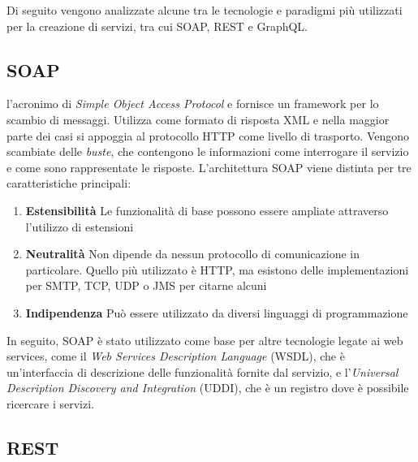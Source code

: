 Di seguito vengono analizzate alcune tra le tecnologie e paradigmi più utilizzati per la creazione di servizi, tra cui SOAP, REST e GraphQL.

\subsection{SOAP\label{sec:soap-introduzione}}

\upe l'acronimo di \emph{Simple Object Access Protocol} e fornisce un framework per lo scambio di messaggi.  Utilizza come formato di risposta XML e nella maggior parte dei casi si appoggia al protocollo HTTP come livello di trasporto. Vengono scambiate delle \emph{buste}, che contengono le informazioni come interrogare il servizio e come sono rappresentate le risposte. L'architettura SOAP viene distinta per tre caratteristiche principali:

\begin{enumerate}
	\item \textbf{Estensibilità} Le funzionalità di base possono essere ampliate attraverso l'utilizzo di estensioni
	\item \textbf{Neutralità} Non dipende da nessun protocollo di comunicazione in particolare. Quello più utilizzato è HTTP, ma esistono delle implementazioni per SMTP, TCP, UDP o JMS per citarne alcuni
	\item \textbf{Indipendenza} Può essere utilizzato da diversi linguaggi di programmazione
\end{enumerate}

In seguito, SOAP è stato utilizzato come base per altre tecnologie legate ai web services, come il \emph{Web Services Description Language} (WSDL), che è un'interfaccia di descrizione delle funzionalità fornite dal servizio, e l'\emph{Universal Description Discovery and Integration} (UDDI), che è un registro dove è possibile ricercare i servizi.

\subsection{REST\label{sec:rest-introduzione}}

